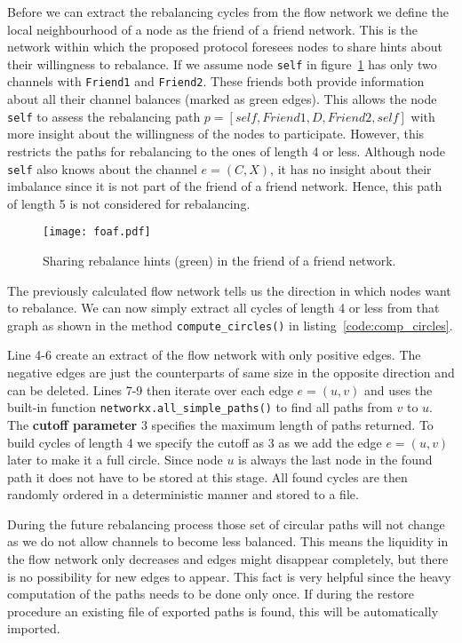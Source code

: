 \documentclass[final]{fhnwreport}       %
\begin{document}
Before we can extract the rebalancing cycles from the flow network we define the local neighbourhood of a node as the friend of a friend network. This is the network within which the proposed protocol foresees nodes to share hints about their willingness to rebalance. If we assume node \texttt{self} in figure~\ref{fig:foaf} has only two channels with \texttt{Friend1} and \texttt{Friend2}. These friends both provide information about all their channel balances (marked as green edges). This allows the node \texttt{self} to assess the rebalancing path $p = [self, Friend1, D, Friend2, self]$ with more insight about the willingness of the nodes to participate. However, this restricts the paths for rebalancing to the ones of length 4 or less. Although node \texttt{self} also knows about the channel $e = (C, X)$, it has no insight about their imbalance since it is not part of the friend of a friend network. Hence, this path of length 5 is not considered for rebalancing.

\begin{figure}[H]
\centering
\texttt{[image: foaf.pdf]}
\caption{Sharing rebalance hints (green) in the friend of a friend network.}
\label{fig:foaf}
\end{figure}

The previously calculated flow network tells us the direction in which nodes want to rebalance. We can now simply extract all cycles of length 4 or less from that graph as shown in the method \texttt{compute_circles()} in listing~\ref{code:comp_circles}. 

Line 4-6 create an extract of the flow network with only positive edges. The negative edges are just the counterparts of same size in the opposite direction and can be deleted. Lines 7-9 then iterate over each edge $e = (u, v)$ and uses the built-in function \texttt{networkx.all_simple_paths()} to find all paths from $v$ to $u$. The \textbf{cutoff parameter} 3 specifies the maximum length of paths returned. To build cycles of length 4 we specify the cutoff as 3 as we add the edge $e = (u, v)$ later to make it a full circle. Since node $u$ is always the last node in the found path it does not have to be stored at this stage. All found cycles are then randomly ordered in a deterministic manner and stored to a file. 

During the future rebalancing process those set of circular paths will not change as we do not allow channels to become less balanced. This means the liquidity in the flow network only decreases and edges might disappear completely, but there is no possibility for new edges to appear. This fact is very helpful since the heavy computation of the paths needs to be done only once. If during the restore procedure an existing file of exported paths is found, this will be automatically imported.
\end{document}
